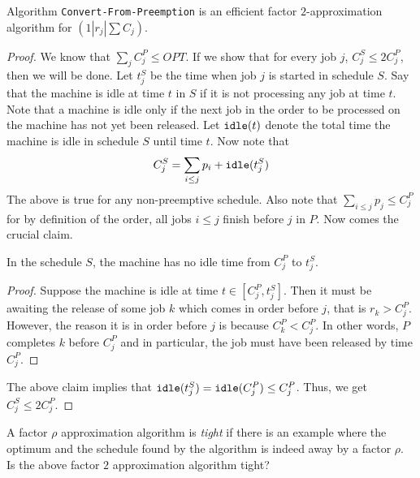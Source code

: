 \documentclass[11pt]{article}
\begin{document}
\begin{theorem}
Algorithm {\tt Convert-From-Preemption} is an efficient factor $2$-approximation algorithm for $(1|r_j|\sum C_j)$.
\end{theorem}
\begin{proof}
We know that $\sum_j C^P_j \le OPT$. If we show that for every job $j$, $C^S_j \le 2C^P_j$, then we will be done.
Let $t^S_j$ be the time when job $j$ is started in schedule $S$.
Say that the machine is idle at time $t$ in $S$ if it is not processing any job at time $t$. Note that a machine is idle 
only if the next job in the order to be processed on the machine has not yet been released. Let ${\tt idle}(t)$ denote the 
total time the machine is idle in schedule $S$ until time $t$.
Now note that 
$$C^S_j = \sum_{i\le j} p_i + {\tt idle}(t^S_j)$$
The above is true for any non-preemptive schedule. Also note that 
$\sum_{i\le j} p_j \le C^P_j$ for by definition of the order, all jobs $i\le j$ finish before $j$ in $P$.
Now comes the crucial claim.

\begin{claim}
In the schedule $S$, the machine has no idle time from $C^P_j$ to $t^S_j$.
\end{claim}
\begin{proof}
Suppose the machine is idle at time $t\in [C^P_j,t^S_j]$. Then it must be awaiting the release of 
some job $k$ which comes in order before $j$, that is $r_k > C^P_j$. However, the reason it is in order before $j$ is 
because $C^P_k < C^P_j$. In other words, $P$ completes $k$ before $C^P_j$ and in particular,
the job must have been released by time $C^P_j$. 
\end{proof}
The above claim implies that ${\tt idle}(t^S_j) = {\tt idle}(C^P_j) \le C^P_j$. 
Thus, we get $C^S_j \le 2C^P_j$.
\end{proof}

A factor $\rho$ approximation algorithm is {\em tight} if there is an example where the optimum and the schedule found by the algorithm is indeed away by a factor $\rho$. Is the above factor $2$ approximation algorithm tight? 
\end{document}
